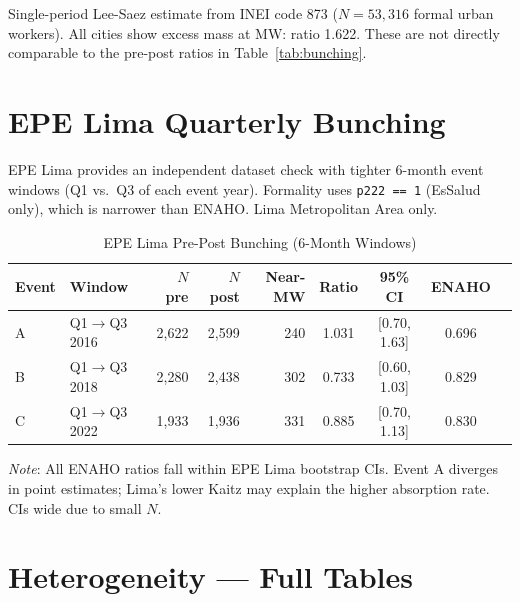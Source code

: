 \documentclass[12pt]{article}
\begin{document}
\begin{appendices}
Single-period Lee-Saez estimate from INEI code 873 ($N = 53{,}316$ formal urban workers). All cities show excess mass at MW: ratio 1.622. These are not directly comparable to the pre-post ratios in Table~\ref{tab:bunching}.

\section{EPE Lima Quarterly Bunching}\label{app:epe}

EPE Lima provides an independent dataset check with tighter 6-month event windows (Q1 vs.\ Q3 of each event year). Formality uses \texttt{p222 == 1} (EsSalud only), which is narrower than ENAHO. Lima Metropolitan Area only.

\begin{table}[H]
\centering
\caption{EPE Lima Pre-Post Bunching (6-Month Windows)}
\label{tab:epe}
\begin{threeparttable}
\small
\begin{tabular}{llrrrcccc}
\toprule
Event & Window & $N$ pre & $N$ post & Near-MW & Ratio & 95\% CI & ENAHO \\
\midrule
A & Q1$\to$Q3 2016 & 2,622 & 2,599 & 240 & 1.031 & [0.70, 1.63] & 0.696 \\
B & Q1$\to$Q3 2018 & 2,280 & 2,438 & 302 & 0.733 & [0.60, 1.03] & 0.829 \\
C & Q1$\to$Q3 2022 & 1,933 & 1,936 & 331 & 0.885 & [0.70, 1.13] & 0.830 \\
\bottomrule
\end{tabular}
\begin{tablenotes}
\small
\item \textit{Note}: All ENAHO ratios fall within EPE Lima bootstrap CIs. Event A diverges in point estimates; Lima's lower Kaitz may explain the higher absorption rate. CIs wide due to small $N$.
\end{tablenotes}
\end{threeparttable}
\end{table}

\section{Heterogeneity --- Full Tables}\label{app:hetero}


\end{appendices}
\end{document}
